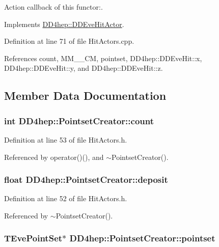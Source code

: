 Action callback of this functor:. 

Implements \hyperlink{struct_d_d4hep_1_1_d_d_eve_hit_actor_a612a0a84bfe41620203555b044019788}{DD4hep::DDEveHitActor}.

Definition at line 71 of file HitActors.cpp.

References count, MM\_\_\-CM, pointset, DD4hep::DDEveHit::x, DD4hep::DDEveHit::y, and DD4hep::DDEveHit::z.

\subsection{Member Data Documentation}
\hypertarget{struct_d_d4hep_1_1_pointset_creator_a190788682e1cb43e03549f1a03377502}{
\subsubsection[{count}]{\setlength{\rightskip}{0pt plus 5cm}int {\bf DD4hep::PointsetCreator::count}}}
\label{struct_d_d4hep_1_1_pointset_creator_a190788682e1cb43e03549f1a03377502}


Definition at line 53 of file HitActors.h.

Referenced by operator()(), and $\sim$PointsetCreator().\hypertarget{struct_d_d4hep_1_1_pointset_creator_a6caa5f448ed788b5ff8bcac223b6e5a8}{
\subsubsection[{deposit}]{\setlength{\rightskip}{0pt plus 5cm}float {\bf DD4hep::PointsetCreator::deposit}}}
\label{struct_d_d4hep_1_1_pointset_creator_a6caa5f448ed788b5ff8bcac223b6e5a8}


Definition at line 52 of file HitActors.h.

Referenced by $\sim$PointsetCreator().\hypertarget{struct_d_d4hep_1_1_pointset_creator_a59f3e1be9bcdc98a6d94a0c1dbee10bd}{
\subsubsection[{pointset}]{\setlength{\rightskip}{0pt plus 5cm}TEvePointSet$\ast$ {\bf DD4hep::PointsetCreator::pointset}}}
\label{struct_d_d4hep_1_1_pointset_creator_a59f3e1be9bcdc98a6d94a0c1dbee10bd}


